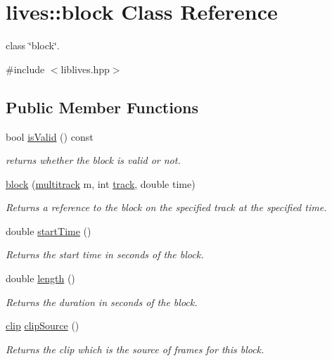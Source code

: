 \hypertarget{classlives_1_1block}{\section{lives\-:\-:block Class Reference}
\label{classlives_1_1block}
}


class \char`\"{}block\char`\"{}.  




{\ttfamily \#include $<$liblives.\-hpp$>$}

\subsection*{Public Member Functions}
\begin{DoxyCompactItemize}
\item 
bool \hyperlink{classlives_1_1block_a7e922c3bcf8e6b5b4db42c40ceee7ca8}{is\-Valid} () const 
\begin{DoxyCompactList}\small\item\em returns whether the block is valid or not. \end{DoxyCompactList}\item 
\hyperlink{classlives_1_1block_a693dafaeb6f875b63b9b648e94555585}{block} (\hyperlink{classlives_1_1multitrack}{multitrack} m, int \hyperlink{classlives_1_1block_abdb3133e3a7fb7cd00073295834dd6be}{track}, double time)
\begin{DoxyCompactList}\small\item\em Returns a reference to the block on the specified track at the specified time. \end{DoxyCompactList}\item 
double \hyperlink{classlives_1_1block_a8ebb34a3c753d90132c980ef63acecdc}{start\-Time} ()
\begin{DoxyCompactList}\small\item\em Returns the start time in seconds of the block. \end{DoxyCompactList}\item 
double \hyperlink{classlives_1_1block_a307eb44c23db25b66384a2c25f37bee2}{length} ()
\begin{DoxyCompactList}\small\item\em Returns the duration in seconds of the block. \end{DoxyCompactList}\item 
\hyperlink{classlives_1_1clip}{clip} \hyperlink{classlives_1_1block_a364d24f0b647e4ea0145e243780886a6}{clip\-Source} ()
\begin{DoxyCompactList}\small\item\em Returns the clip which is the source of frames for this block. \end{DoxyCompactList}\item 

\end{DoxyCompactItemize}
